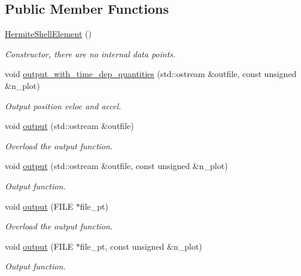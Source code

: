 \subsection*{Public Member Functions}
\begin{DoxyCompactItemize}
\item 
\hyperlink{classoomph_1_1HermiteShellElement_afa11d38b6dd8d1705a6c8f4faf2b99a7}{Hermite\+Shell\+Element} ()
\begin{DoxyCompactList}\small\item\em Constructor, there are no internal data points. \end{DoxyCompactList}\item 
void \hyperlink{classoomph_1_1HermiteShellElement_a78713ac47c51ca8e8081ce7a5bfce592}{output\+\_\+with\+\_\+time\+\_\+dep\+\_\+quantities} (std\+::ostream \&outfile, const unsigned \&n\+\_\+plot)
\begin{DoxyCompactList}\small\item\em Output position veloc and accel. \end{DoxyCompactList}\item 
void \hyperlink{classoomph_1_1HermiteShellElement_af2313040b66727088dc044738b652677}{output} (std\+::ostream \&outfile)
\begin{DoxyCompactList}\small\item\em Overload the output function. \end{DoxyCompactList}\item 
void \hyperlink{classoomph_1_1HermiteShellElement_a2f76280c3af060304800b5bc0aeb02d8}{output} (std\+::ostream \&outfile, const unsigned \&n\+\_\+plot)
\begin{DoxyCompactList}\small\item\em Output function. \end{DoxyCompactList}\item 
void \hyperlink{classoomph_1_1HermiteShellElement_a126ebcc503395e036c6bfaf8fabbc800}{output} (F\+I\+LE $\ast$file\+\_\+pt)
\begin{DoxyCompactList}\small\item\em Overload the output function. \end{DoxyCompactList}\item 
void \hyperlink{classoomph_1_1HermiteShellElement_a805a6e65b4dbb7bcffab6180ff9686ba}{output} (F\+I\+LE $\ast$file\+\_\+pt, const unsigned \&n\+\_\+plot)
\begin{DoxyCompactList}\small\item\em Output function. \end{DoxyCompactList}\end{DoxyCompactItemize}
